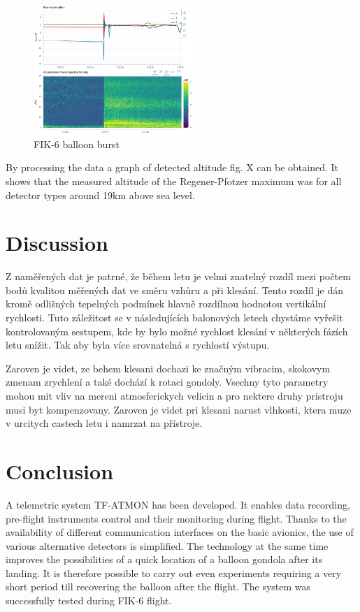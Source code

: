 \documentclass{Rpd}
\begin{document}
\begin{center}
\begin{figure}%
	\centerline{\includegraphics[width=60mm]{img/FIK-6_balloon_burst.png}}
	\caption{FIK-6 balloon burst \label{FIK-6_balloon_burst}}
\end{figure}
\end{center}

By processing the data a graph of detected altitude fig. X can be obtained. It shows that the measured altitude of the Regener-Pfotzer maximum was for all detector types around 19km above sea level. 

\section{Discussion}


Z naměřených dat je patrné, že během letu je velmi znatelný rozdíl mezi počtem bodů kvalitou měřených dat ve směru vzhůru a při klesání. Tento rozdíl je dán kromě odlišných tepelných podmínek hlavně rozdílnou hodnotou vertikální rychlosti.  Tuto záležitost se v následujících balonových letech chystáme vyřešit kontrolovaným sestupem, kde by bylo možné rychlost klesání v některých fázích letu snížit. Tak aby byla více srovnatelná s rychlostí výstupu. 

Zaroven je videt, ze behem klesani dochazi ke značným vibracim, skokovym zmenam zrychlení a také dochází k rotaci gondoly. Vsechny tyto parametry mohou mit vliv na mereni atmosferickych velicin a pro nektere druhy pristroju musi byt kompenzovany. Zaroven je videt pri klesani narust vlhkosti, ktera muze v urcitych castech letu i namrzat na přístroje.



\section{Conclusion}

A telemetric system TF-ATMON has been developed. It enables data recording, pre-flight instruments control and their monitoring during flight. Thanks to the availability of different communication interfaces on the basic avionics, the use of various alternative detectors is simplified. The technology at the same time improves the possibilities of a quick location of a balloon gondola after its landing. It is therefore possible to carry out even experiments requiring a very short period till recovering the balloon after the flight. The system was successfully tested during FIK-6 flight.
\end{document}
